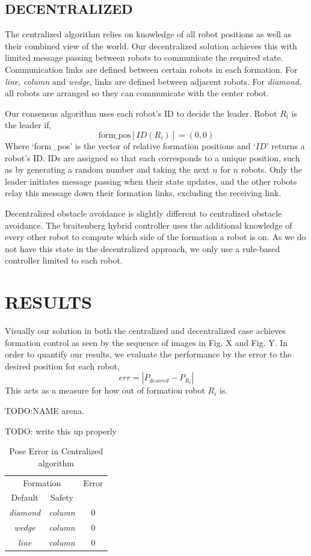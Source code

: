 \documentclass[letterpaper, 10 pt, conference]{ieeeconf}  %
\begin{document}
\subsection{DECENTRALIZED}

The centralized algorithm relies on knowledge of all robot positions as well as their combined view of the world. Our decentralized solution achieves this with limited message passing between robots to communicate the required state. Communication links are defined between certain robots in each formation. For \textit{line}, \textit{column} and \textit{wedge}, links are defined between adjacent robots. For \textit{diamond}, all robots are arranged so they can communicate with the center robot.

Our consensus algorithm uses each robot's ID to decide the leader. Robot $R_i$ is the leader if,
\[\text{form\_pos}[ID(R_i)] = (0,0)\]
Where `form\_pos' is the vector of relative formation positions and `$ID$' returns a robot's ID. IDs are assigned so that each corresponds to a unique position, such as by generating a random number and taking the next $n$ for $n$ robots. Only the leader initiates message passing when their state updates, and the other robots relay this message down their formation links, excluding the receiving link.

Decentralized obstacle avoidance is slightly different to centralized obstacle avoidance. The braitenberg hybrid controller uses the additional knowledge of every other robot to compute which side of the formation a robot is on. As we do not have this state in the decentralized approach, we only use a rule-based controller limited to each robot.

\section{RESULTS}

Visually our solution in both the centralized and decentralized case achieves formation control as seen by the sequence of images in Fig. X and Fig. Y. In order to quantify our results, we evaluate the performance by the error to the desired position for each robot,
\[err = |P_{desired} - P_{R_i}|\]
This acts as a measure for how out of formation robot $R_i$ is.

TODO:NAME arena.

TODO: write this up properly
	
\begin{table}[h]
\begin{center}
\begin{tabular}{|c c|c|}
\hline
\multicolumn{2}{|c|}{Formation} & Error \\
Default & Safety & \\
\hline
\textit{diamond}    & \textit{column} & 0 \\
\textit{wedge}       & \textit{column} & 0 \\
\textit{line}           & \textit{column} & 0 \\
\hline
\end{tabular}
\end{center}
\caption{Pose Error in Centralized algorithm}
\label{table_results_centralized}
\end{table}
\end{document}

